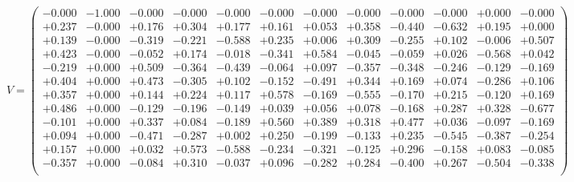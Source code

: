 \documentclass[9pt]{article}
\theoremstyle{plain}
\theoremstyle{definition}
\theoremstyle{remark}
\numberwithin{equation}{section}
\begin{document}
$V = \left(
\begin{array}{
cccccccccccc}
-0.000 & -1.000 & -0.000 & -0.000 & -0.000 & -0.000 & -0.000 & -0.000 & -0.000 & -0.000 & +0.000 & -0.000 \\
+0.237 & -0.000 & +0.176 & +0.304 & +0.177 & +0.161 & +0.053 & +0.358 & -0.440 & -0.632 & +0.195 & +0.000 \\
+0.139 & -0.000 & -0.319 & -0.221 & -0.588 & +0.235 & +0.006 & +0.309 & -0.255 & +0.102 & -0.006 & +0.507 \\
+0.423 & -0.000 & -0.052 & +0.174 & -0.018 & -0.341 & +0.584 & -0.045 & -0.059 & +0.026 & -0.568 & +0.042 \\
-0.219 & +0.000 & +0.509 & -0.364 & -0.439 & -0.064 & +0.097 & -0.357 & -0.348 & -0.246 & -0.129 & -0.169 \\
+0.404 & +0.000 & +0.473 & -0.305 & +0.102 & -0.152 & -0.491 & +0.344 & +0.169 & +0.074 & -0.286 & +0.106 \\
+0.357 & +0.000 & +0.144 & +0.224 & +0.117 & +0.578 & -0.169 & -0.555 & -0.170 & +0.215 & -0.120 & +0.169 \\
+0.486 & +0.000 & -0.129 & -0.196 & -0.149 & +0.039 & +0.056 & +0.078 & -0.168 & +0.287 & +0.328 & -0.677 \\
-0.101 & +0.000 & +0.337 & +0.084 & -0.189 & +0.560 & +0.389 & +0.318 & +0.477 & +0.036 & -0.097 & -0.169 \\
+0.094 & +0.000 & -0.471 & -0.287 & +0.002 & +0.250 & -0.199 & -0.133 & +0.235 & -0.545 & -0.387 & -0.254 \\
+0.157 & +0.000 & +0.032 & +0.573 & -0.588 & -0.234 & -0.321 & -0.125 & +0.296 & -0.158 & +0.083 & -0.085 \\
-0.357 & +0.000 & -0.084 & +0.310 & -0.037 & +0.096 & -0.282 & +0.284 & -0.400 & +0.267 & -0.504 & -0.338 \\
\end{array}
\right)$ \newline 
\end{document}

